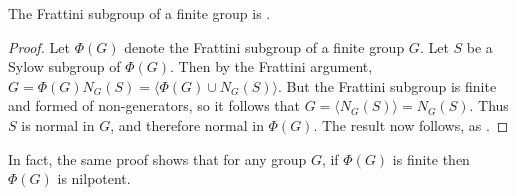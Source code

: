 \documentclass[12pt]{article}
\def\Frat#1{\Phi(#1)}
\def\genby#1{{\langle #1\rangle}}
\begin{document}

The Frattini subgroup of a finite group is .

\begin{proof}
Let $\Frat G$ denote the Frattini subgroup of a finite group $G$.
Let $S$ be a Sylow subgroup of $\Frat G$.
Then by the Frattini argument, $G=\Frat{G}N_G(S)=\genby{\Frat G\cup N_G(S)}$.
But the Frattini subgroup is finite and formed of non-generators,
so it follows that $G=\genby{N_G(S)}=N_G(S)$.
Thus $S$ is normal in $G$, and therefore normal in $\Frat G$.
The result now follows, as .
\end{proof}

In fact, the same proof shows that for any group $G$,
if $\Frat G$ is finite then $\Frat G$ is nilpotent.

\end{document}

